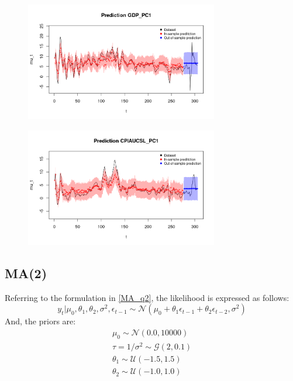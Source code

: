 \begin{figure}[h]
    \centering
    \includegraphics[width=0.75\textwidth]{images/3-MA/gdp_prediction.png}
    \label{fig:MA_first}
\end{figure}
\begin{figure}[h]
    \centering
    \includegraphics[width=0.75\textwidth]{images/3-MA/infl_prediction.png}
    \label{fig:MA_second}
\end{figure}

\subsection*{MA(2)}
\label{MA(2)}
Referring to the formulation in \ref{MA_q2}, the likelihood is expressed as follows:
$$
y_t | \mu_0, \theta_1, \theta_2, \sigma^2, \epsilon_{t-1} \sim \mathcal{N}(\mu_0 + \theta_1 \epsilon_{t-1} + \theta_2 \epsilon_{t-2},\sigma^2)
$$
And, the priors are:
\begin{equation}
    \begin{split}
        \mu_0 \sim \mathcal{N}(0.0, 10000) \\
        \tau = 1 / \sigma^2 \sim \mathcal{G}(2, 0.1) \\
        \theta_1 \sim \mathcal{U}(-1.5, 1.5) \\
        \theta_2 \sim \mathcal{U}(-1.0, 1.0)
    \end{split}
\end{equation}

